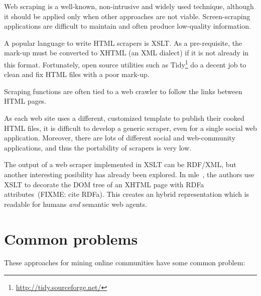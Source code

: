 \documentclass{../templates/www2008-submission}
\begin{document}
Web scraping is a well-known, non-intrusive and widely used technique,
although it should be applied only when other approaches are not viable.
Screen-scraping applications are difficult to maintain and
often produce low-quality information.

A popular language to write HTML scrapers is XSLT. As a pre-requisite,
the mark-up must be converted to XHTML (an XML dialect) if it is not
already in this format. Fortunately, open source utilities such as
Tidy\footnote{\url{http://tidy.sourceforge.net/}} do a decent job
to clean and fix HTML files with a poor mark-up.

Scraping functions are often tied to a web crawler to follow the
links between HTML pages.

As each web site uses a different, customized template to
publish their cooked HTML files, it is
difficult to develop a generic scraper, even for a single social
web application. Moreover, there are lots of different social and
web-community applications, and thus the portability of scrapers
is very low.

The output of a web scraper implemented in XSLT can be RDF/XML, but
another interesting posibility has already been explored. In
mle~\cite{Hausenblas2007}, the authors use XSLT to decorate the
DOM tree of an XHTML page with RDFa attributes~(FIXME: cite RDFa).
This creates an hybrid representation which is readable for
humans \emph{and} semantic web agents.


\section{Common problems}

These approaches for mining online communities have some common problem:
\end{document}
